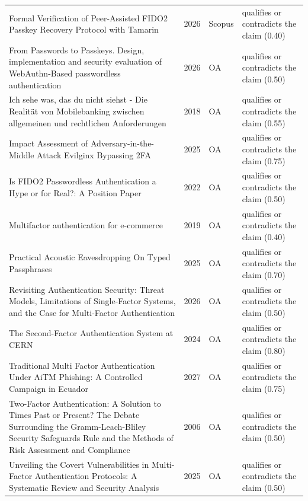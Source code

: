 \begin{longtable}{@{}%
  >{\raggedright\arraybackslash}p{}c%
  >{\raggedright\arraybackslash}p{}%
  >{\raggedright\arraybackslash}p{}@{}}
Formal Verification of Peer-Assisted FIDO2 Passkey Recovery Protocol with Tamarin & 2026 & Scopus & qualifies or contradicts the claim (0.40) \\
From Passwords to Passkeys. Design, implementation and security evaluation of WebAuthn-Based passwordless authentication & 2026 & OA & qualifies or contradicts the claim (0.50) \\
Ich sehe was, das du nicht siehst - Die Realität von Mobilebanking zwischen allgemeinen und rechtlichen Anforderungen & 2018 & OA & qualifies or contradicts the claim (0.55) \\
Impact Assessment of Adversary-in-the-Middle Attack Evilginx Bypassing 2FA & 2025 & OA & qualifies or contradicts the claim (0.75) \\
Is FIDO2 Passwordless Authentication a Hype or for Real?: A Position Paper & 2022 & OA & qualifies or contradicts the claim (0.50) \\
Multifactor authentication for e-commerce & 2019 & OA & qualifies or contradicts the claim (0.40) \\
Practical Acoustic Eavesdropping On Typed Passphrases & 2025 & OA & qualifies or contradicts the claim (0.70) \\
Revisiting Authentication Security: Threat Models, Limitations of Single-Factor Systems, and the Case for Multi-Factor Authentication & 2026 & OA & qualifies or contradicts the claim (0.50) \\
The Second-Factor Authentication System at CERN & 2024 & OA & qualifies or contradicts the claim (0.80) \\
Traditional Multi Factor Authentication Under AiTM Phishing: A Controlled Campaign in Ecuador & 2027 & OA & qualifies or contradicts the claim (0.75) \\
Two-Factor Authentication: A Solution to Times Past or Present? The Debate Surrounding the Gramm-Leach-Bliley Security Safeguards Rule and the Methods of Risk Assessment and Compliance & 2006 & OA & qualifies or contradicts the claim (0.50) \\
Unveiling the Covert Vulnerabilities in Multi-Factor Authentication Protocols: A Systematic Review and Security Analysis & 2025 & OA & qualifies or contradicts the claim (0.50) \\
\end{longtable}
\endgroup
